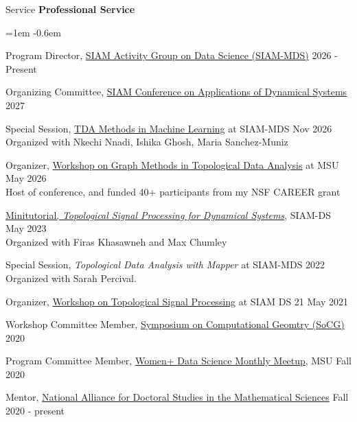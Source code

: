 \documentclass{resume} %
\begin{document}
\begin{rSection}{Service}
\textbf{Professional Service}
\begin{list}{}{\leftmargin=1em}
   \itemsep -0.6em \vspace{-0.5em} %
   \item Program Director, \href{https://www.siam.org/get-involved/connect-with-a-community/activity-groups/data-science/leadership/}{SIAM Activity Group on Data Science (SIAM-MDS)} \hfill 2026 - Present
   \item Organizing Committee, \href{https://www.siam.org/conferences-events/siam-conferences/ds27/}{SIAM Conference on Applications of Dynamical Systems} \hfill 2027
   \item Special Session, \href{https://meetings.siam.org/sess/dsp_programsess.cfm?SESSIONCODE=89669}{ 
TDA Methods in Machine Learning} at SIAM-MDS \hfill Nov 2026\\ 
\phantom{XXX} Organized with Nkechi Nnadi, Ishika Ghosh, Maria Sanchez-Muniz
   \item Organizer, \href{https://munchlab.github.io/graph-methods-tda/}{Workshop on Graph Methods in Topological Data Analysis} at MSU \hfill May 2026\\ 
   \phantom{XXX} Host of conference, and funded 40+ participants from my NSF CAREER grant
   \item \href{https://github.com/TeaspoonTDA/2023-SIAM-DS-TDA-Minitutorial}{Minitutorial, \textit{Topological Signal Processing for Dynamical Systems}}, SIAM-DS \hfill May 2023\\
   \phantom{XXX} Organized with Firas Khasawneh and Max Chumley
   \item Special Session, \textit{Topological Data Analysis with Mapper} at SIAM-MDS \hfill 2022 \\
   \phantom{XXX} Organized with Sarah Percival. 
\item Organizer, \href{https://meetings.siam.org/sess/dsp_programsess.cfm?SESSIONCODE=71292}
{Workshop on Topological Signal Processing} at SIAM DS 21 \hfill May 2021
\item
Workshop Committee Member, \href{https://socg20.inf.ethz.ch/}{Symposium on Computational Geomtry (SoCG)} \hfill 2020
\item
Program Committee Member, \href{https://women-plus-datascience.github.io/}{Women+ Data Science Monthly Meetup}, MSU \hfill Fall 2020 %
\item Mentor, \href{https://mathalliance.org/mentor/liz-munch/}{National Alliance for Doctoral Studies in the Mathematical Sciences} \hfill Fall 2020 - present

\end{list}
\end{rSection}
\end{document}
